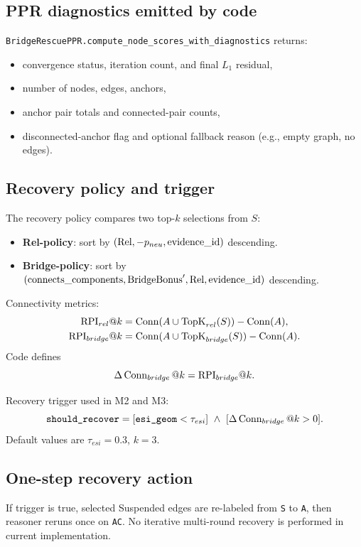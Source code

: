 \subsection{PPR diagnostics emitted by code}
\texttt{BridgeRescuePPR.compute\_node\_scores\_with\_diagnostics} returns:
\begin{itemize}
\item convergence status, iteration count, and final $L_1$ residual,
\item number of nodes, edges, anchors,
\item anchor pair totals and connected-pair counts,
\item disconnected-anchor flag and optional fallback reason (e.g., empty graph, no edges).
\end{itemize}

\subsection{Recovery policy and trigger}
\label{subsec:recovery-trigger}
The recovery policy compares two top-$k$ selections from $S$:
\begin{itemize}
\item \textbf{Rel-policy}: sort by $(\operatorname{Rel}, -p_{neu}, \text{evidence\_id})$ descending.
\item \textbf{Bridge-policy}: sort by
$(\text{connects\_components}, \text{BridgeBonus}', \operatorname{Rel}, \text{evidence\_id})$ descending.
\end{itemize}

Connectivity metrics:
\begin{align}
\text{RPI}_{rel}@k &= \operatorname{Conn}(A\cup \text{TopK}_{rel}(S)) - \operatorname{Conn}(A), \\
\text{RPI}_{bridge}@k &= \operatorname{Conn}(A\cup \text{TopK}_{bridge}(S)) - \operatorname{Conn}(A).
\end{align}
Code defines
\[
\Delta\operatorname{Conn}_{bridge}@k = \text{RPI}_{bridge}@k.
\]

Recovery trigger used in M2 and M3:
\[
\texttt{should\_recover} = [\texttt{esi\_geom}<\tau_{esi}]\ \land\ [\Delta\operatorname{Conn}_{bridge}@k > 0].
\]
Default values are $\tau_{esi}=0.3$, $k=3$.

\subsection{One-step recovery action}
If trigger is true, selected Suspended edges are re-labeled from \texttt{S} to \texttt{A}, then reasoner reruns once on \texttt{A\cup C}.
No iterative multi-round recovery is performed in current implementation.

